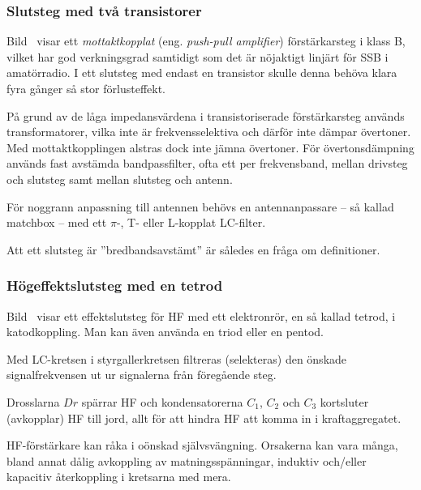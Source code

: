 \subsubsection{Slutsteg med två transistorer}


Bild~ visar ett \emph{mottaktkopplat} (eng.
\emph{push-pull amplifier}) förstärkarsteg i klass B, vilket har god verkningsgrad
samtidigt som det är nöjaktigt linjärt för SSB i amatörradio.
I ett slutsteg med endast en transistor skulle denna behöva klara fyra gånger
så stor förlusteffekt.

På grund av de låga impedansvärdena i transistoriserade förstärkarsteg används
transformatorer, vilka inte är frekvensselektiva och därför inte dämpar
övertoner.
Med mottaktkopplingen alstras dock inte jämna övertoner.
För övertonsdämpning används fast avstämda bandpassfilter, ofta ett per
frekvensband, mellan drivsteg och slutsteg samt mellan slutsteg och antenn.

För noggrann anpassning till antennen behövs en antennanpassare --
så kallad matchbox -- med ett \(\pi \)-, T- eller L-kopplat LC-filter.

Att ett slutsteg är ''bredbandsavstämt'' är således en fråga om definitioner.

\subsubsection{Högeffektslutsteg med en tetrod}


Bild~ visar ett effektslutsteg för HF med ett elektronrör,
en så kallad tetrod, i katodkoppling.
Man kan även använda en triod eller en pentod.

Med LC-kretsen i styrgallerkretsen filtreras (selekteras) den önskade
signalfrekvensen ut ur signalerna från föregående steg.

Drosslarna \(Dr\) spärrar HF och kondensatorerna \(C_1\), \(C_2\) och
\(C_3\) kortsluter (avkopplar) HF till jord,
allt för att hindra HF att komma in i kraftaggregatet.

HF-förstärkare kan råka i oönskad självsvängning.
Orsakerna kan vara många, bland annat dålig avkoppling av matningsspänningar,
induktiv och/eller kapacitiv återkoppling i kretsarna med mera.

